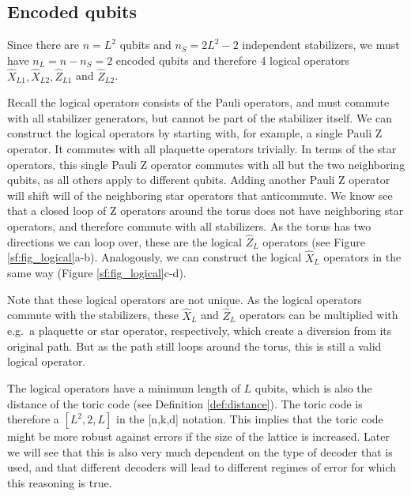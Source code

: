 \subsection{Encoded qubits}
Since there are $n = L^2$ qubits and $n_S = 2L^2 - 2$ independent stabilizers, we must have $n_L = n - n_S = 2$ encoded qubits and therefore 4 logical operators $\hat{X}_{L1}, \hat{X}_{L2}, \hat{Z}_{L1}$ and $\hat{Z}_{L2}$.

Recall the logical operators consists of the Pauli operators, and must commute with all stabilizer generators, but cannot be part of the stabilizer itself. We can construct the logical operators by starting with, for example, a single Pauli Z operator. It commutes with all plaquette operators trivially. In terms of the star operators, this single Pauli Z operator commutes with all but the two neighboring qubits, as all others apply to different qubits. Adding another Pauli Z operator will shift will of the neighboring star operators that anticommute. We know see that a closed loop of Z operators around the torus does not have neighboring star operators, and therefore commute with all stabilizers. As the torus has two directions we can loop over, these are the logical $\hat{Z}_L$ operators (see Figure \ref{sf:fig_logical}a-b). Analogously, we can construct the logical $\hat{X}_L$ operators in the same way (Figure \ref{sf:fig_logical}c-d).

Note that these logical operators are not unique. As the logical operators commute with the stabilizers, these $\hat{X}_L$ and $\hat{Z}_L$ operators can be multiplied with e.g.\ a plaquette or star operator, respectively, which create a diversion from its original path. But as the path still loops around the torus, this is still a valid logical operator.

The logical operators have a minimum length of $L$ qubits, which is also the distance of the toric code (see Definition \ref{def:distance}). The toric code is therefore a $[L^2,2,L]$ in the [n,k,d] notation. This implies that the toric code might be more robust against errors if the size of the lattice is increased. Later we will see that this is also very much dependent on the type of decoder that is used, and that different decoders will lead to different regimes of error for which this reasoning is true.

\def\QS{10}
\def\s{1}

